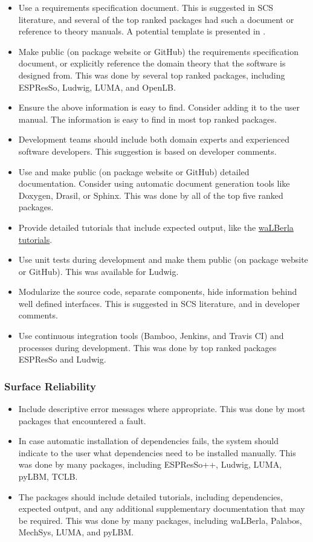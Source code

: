 \documentclass[final, 3p, times, authoryear]{elsarticle}
\begin{document}
\begin{itemize}
	\item Use a requirements specification document. This is suggested in SCS
	literature, and several of the top ranked packages had such a document or
	reference to theory manuals. A potential template is presented in
	\citep{smith2005new}. 
	\item Make public (on package website or GitHub) the requirements
	specification document, or explicitly reference the domain theory that the
	software is designed from.  This was done by several top ranked packages,
	including ESPResSo, Ludwig, LUMA, and OpenLB.
	\item Ensure the above information is easy to find. Consider adding it to
	the user manual. The information is easy to find in most top ranked
	packages.
	\item Development teams should include both domain experts and experienced
	software developers. This suggestion is based on developer comments.
	\item Use and make public (on package website or GitHub) detailed
	documentation. Consider using automatic document generation tools like
	Doxygen, Drasil, or Sphinx. This was done by all of the top five ranked
	packages.
	\item Provide detailed tutorials that include expected output, like the
	\href{https://www.walberla.net/doxygen/index.html}{waLBerla tutorials}.
	\item Use unit tests during development and make them public (on package
	website or GitHub). This was available for Ludwig.
	\item Modularize the source code, separate components, hide information
	behind well defined interfaces. This is suggested in SCS literature, and in
	developer comments.
	\item Use continuous integration tools (Bamboo, Jenkins, and Travis CI) and
	processes during development. This was done by top ranked packages ESPResSo
	and Ludwig.
\end{itemize}

\subsubsection{Surface Reliability}

\begin{itemize}
	\item Include descriptive error messages where appropriate. This was done by
	most packages that encountered a fault.
	\item In case automatic installation of dependencies fails, the system
	should indicate to the user what dependencies need to be installed manually.
	This was done by many packages, including ESPResSo++, Ludwig, LUMA, pyLBM,
	TCLB.
	\item The packages should include detailed tutorials, including
	dependencies, expected output, and any additional supplementary
	documentation that may be required. This was done by many packages,
	including waLBerla, Palabos, MechSys, LUMA, and pyLBM.
\end{itemize}
\end{document}
